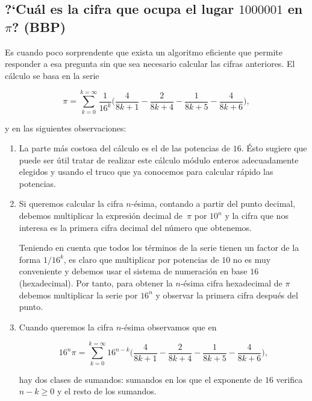 \subsection{?`Cu\'al es la cifra que ocupa el lugar $1000001$ en $\pi$? (BBP)}

Es cuando poco sorprendente que exista un algoritmo eficiente que permite 
responder
a esa pregunta sin que sea necesario calcular las cifras anteriores. El
c\'alculo se basa en la serie 

\begin{equation}\label{picifras}
\pi=\sum_{k=0}^{k=\infty}\frac{1}{16^k}\Big(\frac{4}{8k+1}-\frac{2}{8k+4}-\frac{
1}
{8k+5}-\frac{4}{8k+6}\Big),
\end{equation}

\noindent y en las siguientes observaciones:
\begin{enumerate}
 \item La parte m\'as costosa del c\'alculo es el de las potencias de $16$.
\'Esto sugiere que puede ser \'util
 tratar de realizar este c\'alculo m\'odulo enteros adecuadamente elegidos y
usando el truco que ya conocemos para calcular r\'apido las potencias. 
 
 \item Si queremos calcular la cifra $n$-\'esima, contando a partir del punto
decimal, debemos multiplicar la expresi\'on decimal de~$\pi$ por $10^n$ y la
cifra que nos interesa es la primera cifra decimal del n\'umero
que obtenemos.
 
Teniendo en cuenta que todos los t\'erminos de la serie tienen un factor de la
forma $1/16^k$,  es claro que multiplicar por potencias de $10$ no es muy
conveniente y debemos usar el sistema de numeraci\'on en base $16$
(hexadecimal). Por tanto, para obtener la $n$-\'esima cifra hexadecimal de $\pi$
debemos multiplicar la serie por $16^n$ y observar la primera cifra despu\'es
del punto.
 
 \item Cuando queremos la cifra $n$-\'esima observamos que en 
 
 
 \begin{equation}\label{picifras2}
 16^n\pi=\sum_{k=0}^{k=\infty}16^{n-k}\Big(\frac{4}{8k+1}-\frac{2}{8k+4}-\frac{
 1}
 {8k+5}-\frac{4}{8k+6}\Big),
 \end{equation}
 
 
 
 
hay dos clases de sumandos: sumandos en los que el exponente de $16$ verifica $n-k\ge 0$ y el resto de los
sumandos.  


\end{enumerate}
